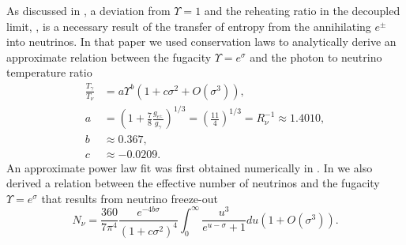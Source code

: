 As discussed in  \cite{Birrell:2013_2}, a deviation from $\Upsilon=1$ and the reheating ratio in the decoupled limit, , is a necessary result of the transfer of entropy from the annihilating $e^\pm$ into neutrinos.  In that paper we used conservation laws to analytically derive an approximate relation between the fugacity $\Upsilon=e^\sigma$ and the photon to neutrino temperature ratio
\begin{align}\label{Upsilon_ratio}
\frac{T_\gamma}{T_\nu}&=a\Upsilon^{b}\left(1+c\sigma^2+O(\sigma^3)\right),\\
\label{value_a}
a&=\left(1+\frac{7}{8}\frac{g_{e^\pm}}{g_\gamma}\right)^{1/3}=\left(\frac{11}{4}\right)^{1/3}=R_\nu^{-1}\approx 1.4010,\\
\label{value_b}
b&\approx 0.367,\\
c&\approx -0.0209.
\end{align}
An approximate power law fit was first obtained numerically in \cite{Birrell2013}. In \cite{Birrell:2013_2} we also derived a relation between the effective number of neutrinos and the fugacity $\Upsilon=e^\sigma$ that results from neutrino freeze-out
\begin{equation}\label{N_nu_approx}
N_\nu=\frac{360}{7\pi^4}\frac{e^{-4b\sigma}}{(1+c\sigma^2)^4}\int_0^\infty \frac{u^3}{e^{u-\sigma}+1}du\left(1+O(\sigma^3)\right).
\end{equation}


